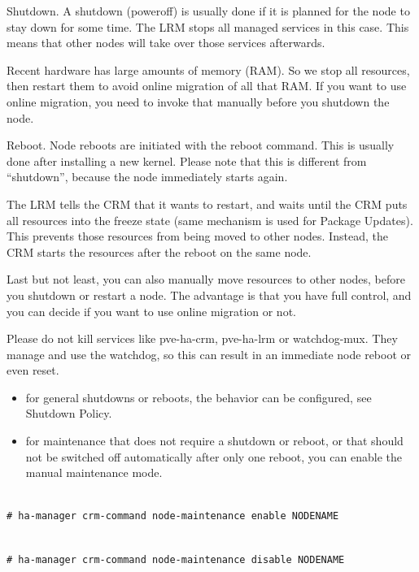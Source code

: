 Shutdown. A shutdown (poweroff) is usually done if it is planned for the node to stay down for some time. The LRM stops all managed services in this case. This means that other nodes will take over those services afterwards.

Recent hardware has large amounts of memory (RAM). So we stop all resources, then restart them to avoid online migration of all that RAM. If you want to use online migration, you need to invoke that manually before you shutdown the node.

Reboot. Node reboots are initiated with the reboot command. This is usually done after installing a new kernel. Please note that this is different from “shutdown”, because the node immediately starts again.

The LRM tells the CRM that it wants to restart, and waits until the CRM puts all resources into the freeze state (same mechanism is used for Package Updates). This prevents those resources from being moved to other nodes. Instead, the CRM starts the resources after the reboot on the same node.

Last but not least, you can also manually move resources to other nodes, before you shutdown or restart a node. The advantage is that you have full control, and you can decide if you want to use online migration or not.

Please do not kill services like pve-ha-crm, pve-ha-lrm or watchdog-mux. They manage and use the watchdog, so this can result in an immediate node reboot or even reset.

\begin{itemize}[leftmargin=2cm]

	\item for general shutdowns or reboots, the behavior can be configured, see Shutdown Policy.

	\item for maintenance that does not require a shutdown or reboot, or that should not be switched off automatically after only one reboot, you can enable the manual maintenance mode.

\end{itemize}

\begin{lstlisting}

# ha-manager crm-command node-maintenance enable NODENAME

\end{lstlisting}

\begin{lstlisting}

# ha-manager crm-command node-maintenance disable NODENAME

\end{lstlisting}


